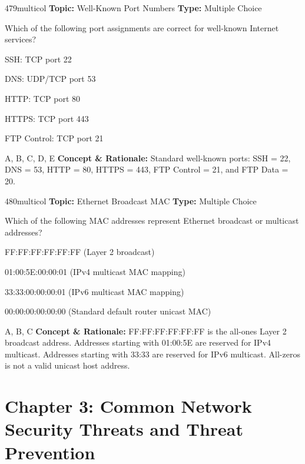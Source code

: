 \begin{qcard}{479}{multicol}
\textcolor{darkslate!75}{\small\textbf{Topic:} Well-Known Port Numbers \hfill \textbf{Type:} Multiple Choice}\vspace{0.4em}\par
Which of the following port assignments are correct for well-known Internet services?
\begin{qoptions}
\item SSH: TCP port 22
\item DNS: UDP/TCP port 53
\item HTTP: TCP port 80
\item HTTPS: TCP port 443
\item FTP Control: TCP port 21
\end{qoptions}
\end{qcard}
\nopagebreak
\begin{explainbox}{A, B, C, D, E}
\textbf{Concept \& Rationale:} Standard well-known ports: SSH = 22, DNS = 53, HTTP = 80, HTTPS = 443, FTP Control = 21, and FTP Data = 20.
\end{explainbox}

\begin{qcard}{480}{multicol}
\textcolor{darkslate!75}{\small\textbf{Topic:} Ethernet Broadcast MAC \hfill \textbf{Type:} Multiple Choice}\vspace{0.4em}\par
Which of the following MAC addresses represent Ethernet broadcast or multicast addresses?
\begin{qoptions}
\item FF:FF:FF:FF:FF:FF (Layer 2 broadcast)
\item 01:00:5E:00:00:01 (IPv4 multicast MAC mapping)
\item 33:33:00:00:00:01 (IPv6 multicast MAC mapping)
\item 00:00:00:00:00:00 (Standard default router unicast MAC)
\end{qoptions}
\end{qcard}
\nopagebreak
\begin{explainbox}{A, B, C}
\textbf{Concept \& Rationale:} FF:FF:FF:FF:FF:FF is the all-ones Layer 2 broadcast address. Addresses starting with 01:00:5E are reserved for IPv4 multicast. Addresses starting with 33:33 are reserved for IPv6 multicast. All-zeros is not a valid unicast host address.
\end{explainbox}

\section{Chapter 3: Common Network Security Threats and Threat Prevention}

